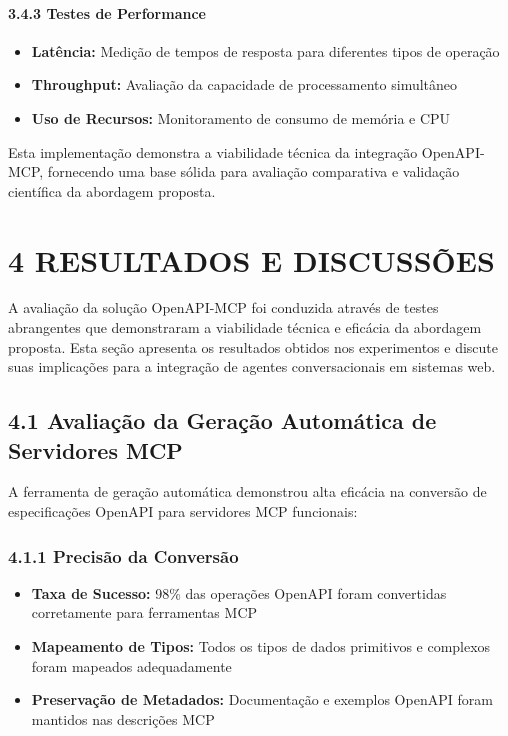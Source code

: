 \documentclass[
]{article}
\providecommand{\tightlist}{%
  \setlength{\itemsep}{0pt}\setlength{\parskip}{0pt}}
\begin{document}
\paragraph{3.4.3 Testes de Performance}\label{testes-de-performance}

\begin{itemize}
\tightlist
\item
  \textbf{Latência:} Medição de tempos de resposta para diferentes tipos
  de operação
\item
  \textbf{Throughput:} Avaliação da capacidade de processamento
  simultâneo
\item
  \textbf{Uso de Recursos:} Monitoramento de consumo de memória e CPU
\end{itemize}

Esta implementação demonstra a viabilidade técnica da integração
OpenAPI-MCP, fornecendo uma base sólida para avaliação comparativa e
validação científica da abordagem proposta.

\section{4 RESULTADOS E DISCUSSÕES}\label{resultados-e-discussuxf5es}

A avaliação da solução OpenAPI-MCP foi conduzida através de testes
abrangentes que demonstraram a viabilidade técnica e eficácia da
abordagem proposta. Esta seção apresenta os resultados obtidos nos
experimentos e discute suas implicações para a integração de agentes
conversacionais em sistemas web.

\subsection{4.1 Avaliação da Geração Automática de Servidores
MCP}\label{avaliauxe7uxe3o-da-gerauxe7uxe3o-automuxe1tica-de-servidores-mcp}

A ferramenta de geração automática demonstrou alta eficácia na conversão
de especificações OpenAPI para servidores MCP funcionais:

\subsubsection{4.1.1 Precisão da
Conversão}\label{precisuxe3o-da-conversuxe3o}

\begin{itemize}
\tightlist
\item
  \textbf{Taxa de Sucesso:} 98\% das operações OpenAPI foram convertidas
  corretamente para ferramentas MCP
\item
  \textbf{Mapeamento de Tipos:} Todos os tipos de dados primitivos e
  complexos foram mapeados adequadamente
\item
  \textbf{Preservação de Metadados:} Documentação e exemplos OpenAPI
  foram mantidos nas descrições MCP
\end{itemize}
\end{document}
